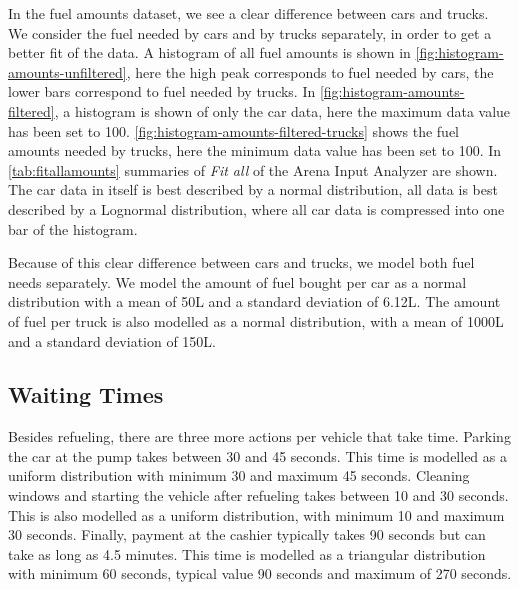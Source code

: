 In the fuel amounts dataset, we see a clear difference between cars and trucks.
We consider the fuel needed by cars and by trucks separately, in order to get a better fit of the data.
A histogram of all fuel amounts is shown in \autoref{fig:histogram-amounts-unfiltered}, here the high peak corresponds to fuel needed by cars, the lower bars correspond to fuel needed by trucks.
In \autoref{fig:histogram-amounts-filtered}, a histogram is shown of only the car data, here the maximum data value has been set to 100.
\autoref{fig:histogram-amounts-filtered-trucks} shows the fuel amounts needed by trucks, here the minimum data value has been set to 100.
In \autoref{tab:fitallamounts} summaries of \textit{Fit all} of the Arena Input Analyzer are shown.
The car data in itself is best described by a normal distribution, all data is best described by a Lognormal distribution, where all car data is compressed into one bar of the histogram.

Because of this clear difference between cars and trucks, we model both fuel needs separately.
We model the amount of fuel bought per car as a normal distribution with a mean of 50L and a standard deviation of 6.12L.
The amount of fuel per truck is also modelled as a normal distribution, with a mean of 1000L and a standard deviation of 150L.

\subsection{Waiting Times}
Besides refueling, there are three more actions per vehicle that take time.
Parking the car at the pump takes between 30 and 45 seconds. 
This time is modelled as a uniform distribution with minimum 30 and maximum 45 seconds.
Cleaning windows and starting the vehicle after refueling takes between 10 and 30 seconds.
This is also modelled as a uniform distribution, with minimum 10 and maximum 30 seconds.
Finally, payment at the cashier typically takes 90 seconds but can take as long as 4.5 minutes. 
This time is modelled as a triangular distribution with minimum 60 seconds, typical value 90 seconds and maximum of 270 seconds.


